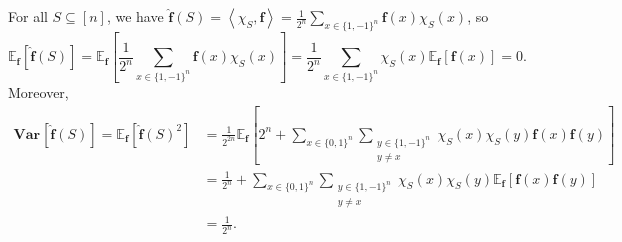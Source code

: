 \documentclass[12pt]{article}
\newcommand{\bitset}{\{0,1\}}
\newcommand{\fbitset}{\{1,-1\}}
\newcommand{\E}[2]{\mathbb E_{#1}\left[#2\right]}
\newcommand{\Var}[2]{\mathbf{Var}_{#1}\left[#2\right]}
\newcommand{\eqn}[1]{\begin{equation*}#1\end{equation*}}
\newcommand{\hf}{\widehat{f}}
\newcommand{\sumx}{\sum_{x \in \bitset^n}}
\newcommand{\sumxf}{\sum_{x \in \fbitset^n}}
\newcommand{\sumS}{\sum_{S \subseteq [n]}}
\renewcommand{\ip}[1]{\left\langle#1\right\rangle}
\begin{document}
\subsection{}

\subsection{}
For all $S \subseteq [n]$, we have $\hat{\mathbf{f}}(S) = \ip{\chi_S,\mathbf{f}} = \frac1{2^n}\sumxf\mathbf{f}(x) \chi_S(x)$, so 
\eqn{\E{\mathbf{f}}{\hat{\mathbf{f}}(S)} = \E{\mathbf{f}}{\frac1{2^n}\sumxf \mathbf{f}(x) \chi_S(x)} = \frac1{2^n}\sumxf\chi_S(x) \E{\mathbf{f}}{\mathbf{f}(x)} = 0.}
Moreover,
\begin{align*}
    \Var{}{\mathbf{\hf}(S)} = \E{\mathbf{f}}{\mathbf{\hat{f}}(S)^2} &= \frac1{2^{2n}}\E{\mathbf{f}}{2^n + \sumx \sum_{\substack{y \in \fbitset^n\\ y \neq x}} \chi_S(x) \chi_S(y) \mathbf{f}(x) \mathbf{f}(y)}\\
    &= \frac1{2^n} + \sumx \sum_{\substack{y \in \fbitset^n\\ y \neq x}} \chi_S(x) \chi_S(y) \E{\mathbf{f}}{\mathbf{f}(x) \mathbf{f}(y)}\\
    &= \frac1{2^n}.
\end{align*}

\subsection{}

\subsection{}

\subsection{}

\subsection{}

\subsection{}
\end{document}
